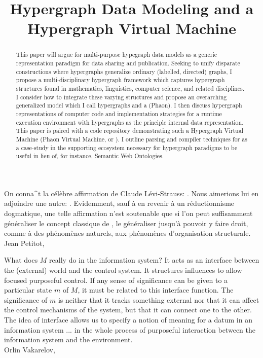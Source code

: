 \documentclass[11pt,twocolumn]{article}
\begin{document}
\title{Hypergraph Data Modeling and a Hypergraph Virtual Machine}
\maketitle{}
\begin{abstract}This paper will argue for multi-purpose hypegraph data models as a 
generic representation paradigm for data sharing and publication.  
Seeking to unify disparate constructions where hypergraphs generalize 
ordinary (labelled, directed) graphs, I propose a multi-disciplinary 
hypergraph framework which captures hypergraph structures found 
in mathematics, linguistics, computer science, and related disciplines.  
I consider how to integrate these varying structures and propose an 
overarching generalized model which I call  hypergraphs 
and a  (Phaon).    
I then discuss hypergraph representations of computer code and 
implementation strategies for a runtime execution environment 
with hypergraphs as the principle internal data representation.  
This paper is paired with a code repository demonstrating such a 
Hypergraph Virtual Machine (Phaon Virtual Machine, or \PVM{}).  
I outline parsing and compiler techniques for \PVM{} as a 
case-study in the supporting ecosystem necessary for 
hypergraph paradigms to be useful in lieu of, for 
instance, Semantic Web Ontologies.
\end{abstract}
\begin{frquote}On conna\^{\OldI}t la c\'{e}l\`{e}bre affirmation de Claude L\'{e}vi-Strauss: 
.  Nous aimerions lui en
adjoindre une autre: . 
Evidemment, sauf \`{a} en revenir \`{a} un r\'{e}ductionnisme dogmatique, une telle
affirmation n'est soutenable que si l'on peut suffisamment g\'{e}n\'{e}raliser le concept
classique de , le g\'{e}n\'{e}raliser jusqu'\`{a} pouvoir y faire droit, 
comme \`{a} des ph\'{e}nom\`{e}nes naturels, aux ph\'{e}nom\`{e}nes d'organisation structurale.
\\ \longdash{} Jean Petitot, \cite[p. 1]{PetitotSyntaxe}{}
\end{frquote}
\begin{frquote}What does $M$ really do in the information system?  It acts as
an interface between the (external) world and the control 
system.  It structures influences to allow focused purposeful
control.  If any sense of significance can be given
to a particular state $m$ of $M$, it must be related
to this interface function.  The
significance of $m$ is neither that it
tracks something external nor
that it can affect the
control mechanisms of the system,
but that it can connect one to the
other.  The idea of interface allows
us to specify a notion of meaning for a datum
in an information system ... in the whole process
of purposeful interaction between the information system and the environment.
\\ \longdash{} Orlin Vakarelov, \cite[p. 15-16]{OrlinVakarelov}{}
\end{frquote}
\vspace{1em}






\end{document}

